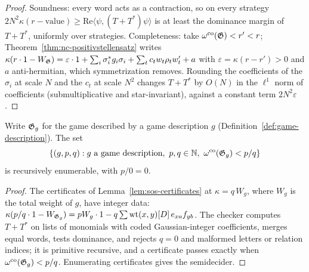 \begin{proof}
\leanok
Soundness: every word acts as a contraction, so on every strategy
$2 N^2 \kappa (r - \text{value}) \geq \mathrm{Re} \langle \psi, (T + T^*)\psi \rangle$ is at
least the dominance margin of $T + T^*$, uniformly over strategies. Completeness: take
$\omega^{\mathrm{co}}(\mathfrak{G}) < r' < r$; Theorem~\ref{thm:nc-positivstellensatz} writes
$\kappa(r \cdot 1 - W_{\mathfrak{G}}) = \varepsilon \cdot 1 + \sum_i \sigma_i^* g_i \sigma_i +
\sum_t c_t w_t \rho_t w'_t + a$ with $\varepsilon = \kappa(r - r') > 0$ and $a$
anti-hermitian, which symmetrization removes. Rounding the coefficients of the $\sigma_i$ at
scale $N$ and the $c_t$ at scale $N^2$ changes $T + T^*$ by $O(N)$ in the $\ell^1$ norm of
coefficients (submultiplicative and star-invariant), against a constant term
$2N^2\varepsilon$.
\end{proof}

\effortMedium

\begin{lemma}
\label{lem:valco-upper-re}
\leanok
Write $\mathfrak{G}_g$ for the game described by a game description $g$
(Definition~\ref{def:game-description}). The set
\[
  \{ (g, p, q) : g \text{ a game description},\ p, q \in \mathbb{N},\ \omega^{\mathrm{co}}(\mathfrak{G}_g) < p/q \}
\]
is recursively enumerable, with $p/0 = 0$.
\end{lemma}

\begin{proof}
\leanok
The certificates of Lemma~\ref{lem:sos-certificates} at $\kappa = q\, W_g$, where $W_g$ is
the total weight of $g$, have integer data: $\kappa(p/q \cdot 1 - W_{\mathfrak{G}_g}) = p W_g \cdot 1 -
q \sum \mathrm{wt}(x,y)[D]\, e_{xa} f_{yb}$. The checker computes $T + T^*$ on lists of
monomials with coded Gaussian-integer coefficients, merges equal words, tests dominance, and
rejects $q = 0$ and malformed letters or relation indices; it is primitive recursive, and a
certificate passes exactly when $\omega^{\mathrm{co}}(\mathfrak{G}_g) < p/q$. Enumerating certificates gives the
semidecider.
\end{proof}

